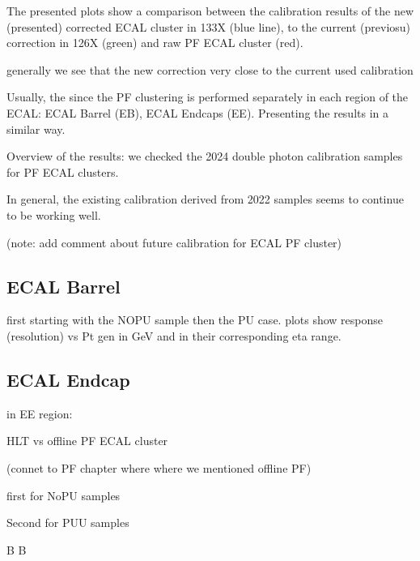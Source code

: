 The presented plots show a comparison between the calibration results of the new (presented) corrected ECAL cluster in 133X (blue line), to the current (previosu)  correction in 126X (green) and  raw PF ECAL cluster (red).

generally we see that the new correction very close to the current used calibration

Usually, the since the PF clustering is performed separately in each region of the ECAL: ECAL Barrel (EB), ECAL Endcaps (EE).
Presenting the results in a similar way.

Overview of the results: we checked the 2024 double photon calibration samples for PF ECAL clusters.

In general, the existing calibration derived from 2022 samples seems to continue to be working well.


(note: add comment about future calibration for ECAL PF cluster)

\subsection{ECAL Barrel}
first starting with the NOPU sample then the PU case.
plots show response (resolution) vs Pt gen in GeV and in their corresponding eta range.





\subsection{ECAL Endcap}
in EE region:





HLT vs offline PF ECAL cluster

(connet to PF chapter where where we mentioned offline PF)

first for NoPU samples

Second for PUU samples

B
B
